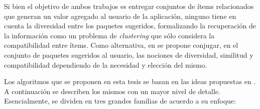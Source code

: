 Si bien el objetivo de ambos trabajos es entregar conjuntos de ítems relacionados que generan un valor agregado al usuario de la aplicación, ninguno tiene en cuenta la diversidad entre los paquetes sugeridos, formalizando la recuperación de la información como un problema de {\em clustering} que sólo considera la compatibilidad entre ítems. Como alternativa, en \cite{journals/tkde/Amer-YahiaBCFMZ14} se propone conjugar, en el conjunto de paquetes sugeridos al usuario, las nociones de diversidad, similitud y compatibilidad dependiendo de la necesidad y elección del mismo.

Los algoritmos que se proponen en esta tesis se basan en las ideas propuestas en \cite{journals/tkde/Amer-YahiaBCFMZ14}. A continuación se describen los mismos con un mayor nivel de detalle. Esencialmente, se dividen en tres grandes familias de acuerdo a su enfoque:

